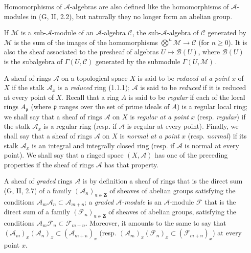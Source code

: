 \begin{env}[4.1.3]
Homomorphisms of $\mathcal{A}$-algebras are also defined like the
homomorphisms of $\mathcal{A}$-modules in (G, II, 2.2), but naturally
they no longer form an abelian group.

If $\mathcal{M}$ is a sub-$\mathcal{A}$-module of an
$\mathcal{A}$-algebra $\mathcal{C}$, the sub-$\mathcal{A}$-algebra of
$\mathcal{C}$ generated by $\mathcal{M}$ is the sum of the images of the
homomorphisms $\bigotimes^n\mathcal{M}\to\mathcal{C}$ (for
$n\geqslant 0$). It is also the sheaf associated to the presheaf of algebras
$U\mapsto\mathcal{B}(U)$, where $\mathcal{B}(U)$ is the subalgebra
of $\Gamma(U,\mathcal{C})$ generated by the submodule
$\Gamma(U,\mathcal{M})$.
\end{env}

\begin{env}[4.1.4]
\label{0.4.1.4}
A sheaf of rings $\mathcal{A}$ on a topological space $X$ is said to be
\emph{reduced at a point} $x$ of $X$ if the stalk $\mathcal{A}_x$ is a
\emph{reduced} ring (1.1.1); $\mathcal{A}$ is said to be \emph{reduced}
if it is reduced at every point of $X$. Recall that a ring $A$ is said to be
\emph{regular} if each of the local rings $A_{\mathfrak p}$ (where
$\mathfrak p$ ranges over the set of prime ideals of $A$) is a regular
local ring; we shall say that a sheaf of rings $\mathcal{A}$ on $X$
is \emph{regular at a point} $x$ (resp. \emph{regular}) if the stalk
$\mathcal{A}_x$ is a regular ring (resp. if $\mathcal{A}$ is regular
at every point). Finally, we shall say that a sheaf of rings $\mathcal{A}$ on
$X$ is \emph{normal at a point} $x$ (resp. \emph{normal}) if its stalk
$\mathcal{A}_x$ is an integral and integrally closed ring (resp. if
$\mathcal{A}$ is normal at every point). We shall say that a ringed space
$(X,\mathcal{A})$ has one of the preceding properties if the sheaf of rings
$\mathcal{A}$ has that property.

A sheaf of \emph{graded} rings $\mathcal{A}$ is by definition a
sheaf of rings that is the direct sum (G, II, 2.7) of a family
$(\mathcal{A}_n)_{n\in\mathbf Z}$ of sheaves of abelian groups satisfying the
conditions $\mathcal{A}_m\mathcal{A}_n\subset\mathcal{A}_{m+n}$; a
\emph{graded $\mathcal{A}$-module} is an $\mathcal{A}$-module
$\mathcal{F}$ that is the direct sum of a family
$(\mathcal{F}_n)_{n\in\mathbf Z}$ of sheaves of abelian groups,
satisfying the conditions
$\mathcal{A}_m\mathcal{F}_n\subset\mathcal{F}_{m+n}$. Moreover, it amounts
to the same to say that
$(\mathcal{A}_m)_x(\mathcal{A}_n)_x\subset(\mathcal{A}_{m+n})_x$
(resp.
$(\mathcal{A}_m)_x(\mathcal{F}_n)_x\subset(\mathcal{F}_{m+n})_x$)
at every point $x$.
\end{env}

